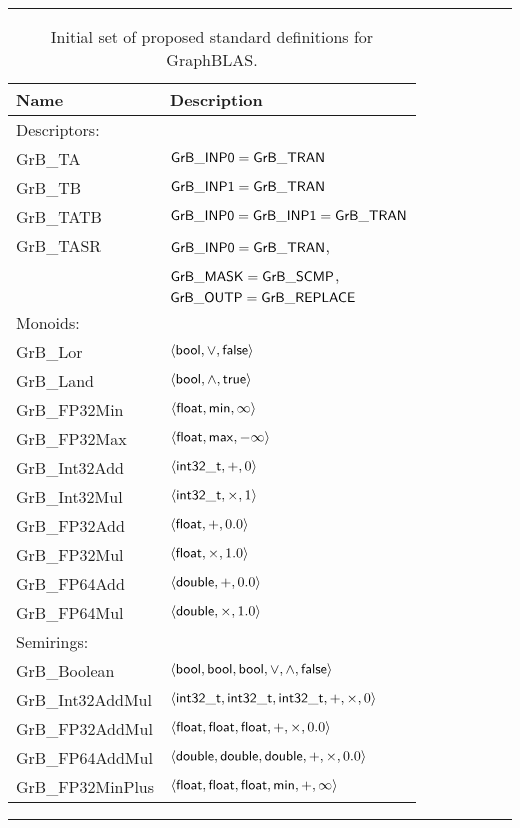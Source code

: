 \begin{table}[bt]
	\hrule
	\caption{Initial set of proposed standard definitions for GraphBLAS.}
	\label{Tab:stddef}
	\begin{center}
	\begin{tabular}{|l|l|} \hline
		 Name				& Description \\ \hline
         Descriptors: & \\
				{\sf GrB\_TA}			& ${\sf GrB\_INP0} = {\sf GrB\_TRAN}$ \\
                {\sf GrB\_TB}			& ${\sf GrB\_INP1} = {\sf GrB\_TRAN}$ \\ 
				{\sf GrB\_TATB}		& ${\sf GrB\_INP0} = {\sf GrB\_INP1} = {\sf GrB\_TRAN}$ \\
				{\sf GrB\_TASR}		& ${\sf GrB\_INP0} = {\sf GrB\_TRAN}$, \\
							& ${\sf GrB\_MASK} = {\sf GrB\_SCMP}$, \\
							& ${\sf GrB\_OUTP} = {\sf GrB\_REPLACE}$ \\ \hline
		Monoids:	& \\
				{\sf GrB\_Lor}		& $\left\langle {\sf bool}, \vee, {\sf false} \right\rangle$ \\
				{\sf GrB\_Land}		& $\left\langle {\sf bool}, \wedge, {\sf true} \right\rangle$ \\
				{\sf GrB\_FP32Min}		& $\left\langle {\sf float}, {\sf min}, \infty \right\rangle$ \\
				{\sf GrB\_FP32Max}		& $\left\langle {\sf float}, {\sf max}, -\infty \right\rangle$ \\
				{\sf GrB\_Int32Add}		& $\left\langle {\sf int32\_t}, +, 0 \right\rangle$ \\
                {\sf GrB\_Int32Mul}		& $\left\langle {\sf int32\_t}, \times, 1 \right\rangle$ \\
				{\sf GrB\_FP32Add}		& $\left\langle {\sf float}, +, 0.0 \right\rangle$ \\
				{\sf GrB\_FP32Mul}		& $\left\langle {\sf float}, \times, 1.0 \right\rangle$ \\
				{\sf GrB\_FP64Add}		& $\left\langle {\sf double}, +, 0.0 \right\rangle$ \\ 
				{\sf GrB\_FP64Mul}		& $\left\langle {\sf double}, \times, 1.0 \right\rangle$ \\ \hline
		Semirings:	& \\
				{\sf GrB\_Boolean}		& $\left\langle {\sf bool}, {\sf bool}, {\sf bool}, \vee, \wedge, {\sf false} \right\rangle$ \\
                {\sf GrB\_Int32AddMul}	& $\left\langle {\sf int32\_t}, {\sf int32\_t}, {\sf int32\_t}, +, \times, 0 \right\rangle$ \\
				{\sf GrB\_FP32AddMul}		& $\left\langle {\sf float}, {\sf float}, {\sf float}, +, \times, 0.0 \right\rangle$ \\ 
				{\sf GrB\_FP64AddMul}		& $\left\langle {\sf double}, {\sf double}, {\sf double}, +, \times, 0.0 \right\rangle$ \\ 
                {\sf GrB\_FP32MinPlus}	& $\left\langle {\sf float}, {\sf float}, {\sf float}, {\sf min}, +, \infty \right\rangle$ \\\hline
	\end{tabular}
	\end{center}
	\hrule
\end{table}
